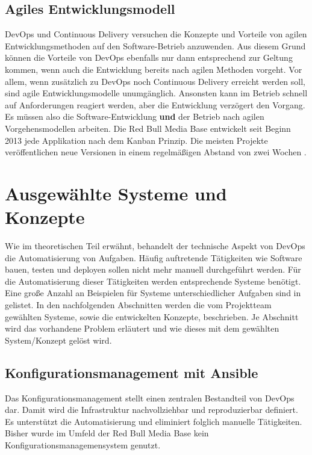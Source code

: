 \subsection{Agiles Entwicklungsmodell}
DevOps und Continuous Delivery versuchen die Konzepte und Vorteile von agilen Entwicklungsmethoden auf den Software-Betrieb anzuwenden. Aus diesem Grund können die Vorteile von DevOps ebenfalls nur dann entsprechend zur Geltung kommen, wenn auch die Entwicklung bereits nach agilen Methoden vorgeht. Vor allem, wenn zusätzlich zu DevOps noch Continuous Delivery erreicht werden soll, sind agile Entwicklungsmodelle unumgänglich. Ansonsten kann im Betrieb schnell auf Anforderungen reagiert werden, aber die Entwicklung verzögert den Vorgang. Es müssen also die Software-Entwicklung \textbf{und} der Betrieb nach agilen Vorgehensmodellen arbeiten. Die Red Bull Media Base entwickelt seit Beginn 2013 jede Applikation nach dem Kanban Prinzip. Die meisten Projekte veröffentlichen neue Versionen in einem regelmäßigen Abstand von zwei Wochen \cite{gluchowski2013}.

\section{Ausgewählte Systeme und Konzepte}
\label{sec:systemeundkonzepte}
Wie im theoretischen Teil erwähnt, behandelt der technische Aspekt von DevOps die Automatisierung von Aufgaben. Häufig auftretende Tätigkeiten wie Software bauen, testen und deployen sollen nicht mehr manuell durchgeführt werden. Für die Automatisierung dieser Tätigkeiten werden entsprechende Systeme benötigt. Eine große Anzahl an Beispielen für Systeme unterschiedlicher Aufgaben sind in \cite{skelton2014} gelistet. In den nachfolgenden Abschnitten werden die vom Projektteam gewählten Systeme, sowie die entwickelten Konzepte, beschrieben. Je Abschnitt wird das vorhandene Problem erläutert und wie dieses mit dem gewählten System/Konzept gelöst wird.

\subsection{Konfigurationsmanagement mit Ansible}
Das Konfigurationsmanagement stellt einen zentralen Bestandteil von DevOps dar. Damit wird die Infrastruktur nachvollziehbar und reproduzierbar definiert. Es unterstützt die Automatisierung und eliminiert folglich manuelle Tätigkeiten. Bisher wurde im Umfeld der Red Bull Media Base kein Konfigurationsmanagemensystem genutzt. 

